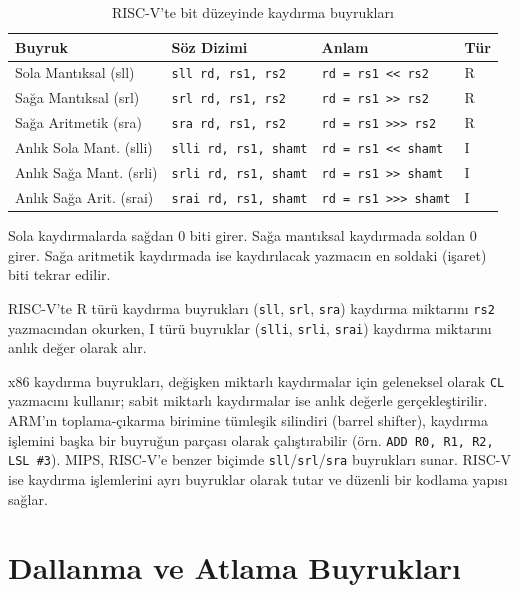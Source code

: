 \begin{table}[H]
\centering
\caption{RISC-V'te bit düzeyinde kaydırma buyrukları}
\label{tab:kaydirma-buyruklar}
\begin{tabular}{llll}
\toprule
\textbf{Buyruk} & \textbf{Söz Dizimi} & \textbf{Anlam} & \textbf{Tür} \\
\midrule
Sola Mantıksal (sll)      & \texttt{sll rd, rs1, rs2}    & \texttt{rd = rs1 << rs2}  & R \\
Sağa Mantıksal (srl)      & \texttt{srl rd, rs1, rs2}    & \texttt{rd = rs1 >> rs2}  & R \\
Sağa Aritmetik (sra)      & \texttt{sra rd, rs1, rs2}    & \texttt{rd = rs1 >>> rs2} & R \\
Anlık Sola Mant. (slli)   & \texttt{slli rd, rs1, shamt} & \texttt{rd = rs1 << shamt} & I \\
Anlık Sağa Mant. (srli)   & \texttt{srli rd, rs1, shamt} & \texttt{rd = rs1 >> shamt} & I \\
Anlık Sağa Arit. (srai)   & \texttt{srai rd, rs1, shamt} & \texttt{rd = rs1 >>> shamt} & I \\
\bottomrule
\end{tabular}
\end{table}

Sola kaydırmalarda sağdan 0 biti girer. Sağa mantıksal kaydırmada soldan 0 girer. Sağa aritmetik kaydırmada ise kaydırılacak yazmacın en soldaki (işaret) biti tekrar edilir.

RISC-V'te R türü kaydırma buyrukları (\texttt{sll}, \texttt{srl}, \texttt{sra}) kaydırma miktarını \texttt{rs2} yazmacından okurken, I türü buyruklar (\texttt{slli}, \texttt{srli}, \texttt{srai}) kaydırma miktarını anlık değer olarak alır.


\begin{karsilastirma}
x86 kaydırma buyrukları, değişken miktarlı kaydırmalar için geleneksel olarak \texttt{CL} yazmacını kullanır; sabit miktarlı kaydırmalar ise anlık değerle gerçekleştirilir. ARM'ın toplama-çıkarma birimine tümleşik silindiri (barrel shifter), kaydırma işlemini başka bir buyruğun parçası olarak çalıştırabilir (örn. \texttt{ADD R0, R1, R2, LSL \#3}). MIPS, RISC-V'e benzer biçimde \texttt{sll}/\texttt{srl}/\texttt{sra} buyrukları sunar. RISC-V ise kaydırma işlemlerini ayrı buyruklar olarak tutar ve düzenli bir kodlama yapısı sağlar.
\end{karsilastirma}

\section{Dallanma ve Atlama Buyrukları}
\label{sec:dallanma-buyruklar}

